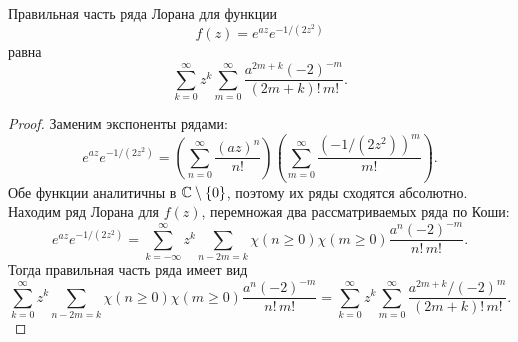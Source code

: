\documentclass[../paper.tex]{subfiles}
\begin{document}
\begin{Lem}
\label{laurent-2}
Правильная часть ряда Лорана для функции
\[
	f(z) = e^{az} e^{-1/(2z^2)}
\]
равна
\[
	\sum_{k=0}^{\infty} z^k \sum_{m=0}^{\infty} \frac{a^{2m+k}(-2)^{-m}}{(2m+k)!\,m!}
.\]
\end{Lem}

\begin{proof}
Заменим экспоненты рядами:
\[
	e^{az} e^{-1/(2z^2)}
	= \left( \sum_{n=0}^{\infty} \frac{(az)^n}{n!} \right)
		\left( \sum_{m=0}^{\infty} \frac{\left( -1 / \left( 2z^2 \right) \right)^m}{m!}  \right) 
.\]
Обе функции аналитичны в $\mathbb{C} \setminus \{0\}$, поэтому их ряды сходятся абсолютно.
Находим ряд Лорана для $f(z)$, перемножая два рассматриваемых ряда по Коши:
\[
	e^{az} e^{-1/(2z^2)}
	= \sum_{k=-\infty}^{\infty} z^k \sum_{n-2m=k} \chi(n \ge 0) \chi(m \ge 0) \frac{a^n (-2)^{-m}}{n!\,m!}
.\]
Тогда правильная часть ряда имеет вид
\[
	\sum_{k=0}^{\infty} z^k \sum_{n-2m=k} \chi(n \ge 0) \chi(m \ge 0) \frac{a^n (-2)^{-m}}{n!\,m!} =
	\sum_{k=0}^{\infty} z^k \sum_{m=0}^{\infty} \frac{a^{2m+k} / (-2)^m}{(2m+k)!\,m!}
.\]
\end{proof}
\end{document}
